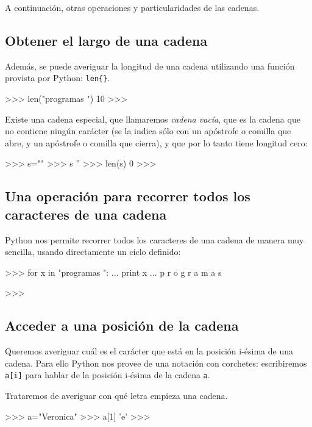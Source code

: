 A continuación, otras operaciones y particularidades de las cadenas.

\subsection{Obtener el largo de una cadena}

Además, se puede averiguar la longitud de una cadena utilizando
una función provista por Python: \lstinline+len{}+.
\begin{codigo-python-sn}
>>> len("programas ")
10
>>>
\end{codigo-python-sn}

Existe una cadena especial, que llamaremos {\it cadena vacía}, que
es la cadena que no contiene ningún carácter (se la indica sólo con
un apóstrofe o comilla que abre, y un apóstrofe o comilla que cierra),
y que por lo tanto tiene longitud cero:

\begin{codigo-python-sn}
>>> s=""
>>> s
''
>>> len(s)
0
>>>
\end{codigo-python-sn}

\subsection[Recorrer una cadena]{Una operación para recorrer todos los caracteres de una cadena}

Python nos permite recorrer todos los caracteres de una cadena de
manera muy sencilla, usando directamente un ciclo definido:

\begin{codigo-python-sn}
>>> for x in "programas ":
...     print x
...
p
r
o
g
r
a
m
a
s

>>>
\end{codigo-python-sn}

\subsection{Acceder a una posición de la cadena}

Queremos averiguar cuál es el carácter que está en la posición i-ésima de
una cadena.  Para ello Python nos provee de una notación con corchetes:
escribiremos \lstinline+a[i]+ para hablar de la posición i-ésima de la cadena
\lstinline!a!.

Trataremos de averiguar con qué letra empieza una cadena.

\begin{codigo-python-sn}
>>> a="Veronica"
>>> a[1]
'e'
>>>
\end{codigo-python-sn}

